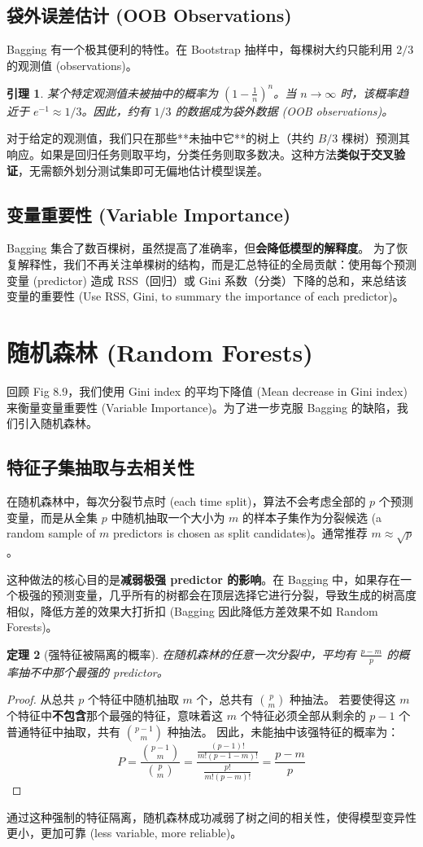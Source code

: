 \documentclass[UTF8]{ctexart}
\newtheorem{theorem}{定理}[section]
\newtheorem{lemma}[theorem]{引理}
\numberwithin{equation}{section}
\begin{document}
\subsection{袋外误差估计 (OOB Observations)}
Bagging 有一个极其便利的特性。在 Bootstrap 抽样中，每棵树大约只能利用 $2/3$ 的观测值 (observations)。
\begin{lemma}
某个特定观测值未被抽中的概率为 $(1 - \frac{1}{n})^n$。当 $n \to \infty$ 时，该概率趋近于 $e^{-1} \approx 1/3$。因此，约有 $1/3$ 的数据成为袋外数据 (OOB observations)。
\end{lemma}
对于给定的观测值，我们只在那些**未抽中它**的树上（共约 $B/3$ 棵树）预测其响应。如果是回归任务则取平均，分类任务则取多数决。这种方法\textbf{类似于交叉验证}，无需额外划分测试集即可无偏地估计模型误差。

\subsection{变量重要性 (Variable Importance)}
Bagging 集合了数百棵树，虽然提高了准确率，但\textbf{会降低模型的解释度}。
为了恢复解释性，我们不再关注单棵树的结构，而是汇总特征的全局贡献：使用每个预测变量 (predictor) 造成 RSS（回归）或 Gini 系数（分类）下降的总和，来总结该变量的重要性 (Use RSS, Gini, to summary the importance of each predictor)。


\section{随机森林 (Random Forests)}
回顾 Fig 8.9，我们使用 Gini index 的平均下降值 (Mean decrease in Gini index) 来衡量变量重要性 (Variable Importance)。为了进一步克服 Bagging 的缺陷，我们引入随机森林。

\subsection{特征子集抽取与去相关性}
在随机森林中，每次分裂节点时 (each time split)，算法不会考虑全部的 $p$ 个预测变量，而是从全集 $p$ 中随机抽取一个大小为 $m$ 的样本子集作为分裂候选 (a random sample of $m$ predictors is chosen as split candidates)。通常推荐 $m \approx \sqrt{p}$。

这种做法的核心目的是\textbf{减弱极强 predictor 的影响}。在 Bagging 中，如果存在一个极强的预测变量，几乎所有的树都会在顶层选择它进行分裂，导致生成的树高度相似，降低方差的效果大打折扣 (Bagging 因此降低方差效果不如 Random Forests)。

\begin{theorem}[强特征被隔离的概率]
在随机森林的任意一次分裂中，平均有 $\frac{p-m}{p}$ 的概率抽不中那个最强的 predictor。
\end{theorem}
\begin{proof}
从总共 $p$ 个特征中随机抽取 $m$ 个，总共有 $\binom{p}{m}$ 种抽法。
若要使得这 $m$ 个特征中\textbf{不包含}那个最强的特征，意味着这 $m$ 个特征必须全部从剩余的 $p-1$ 个普通特征中抽取，共有 $\binom{p-1}{m}$ 种抽法。
因此，未能抽中该强特征的概率为：
$$ P = \frac{\binom{p-1}{m}}{\binom{p}{m}} = \frac{\frac{(p-1)!}{m!(p-1-m)!}}{\frac{p!}{m!(p-m)!}} = \frac{p-m}{p} $$
\end{proof}
通过这种强制的特征隔离，随机森林成功减弱了树之间的相关性，使得模型变异性更小，更加可靠 (less variable, more reliable)。
\end{document}
